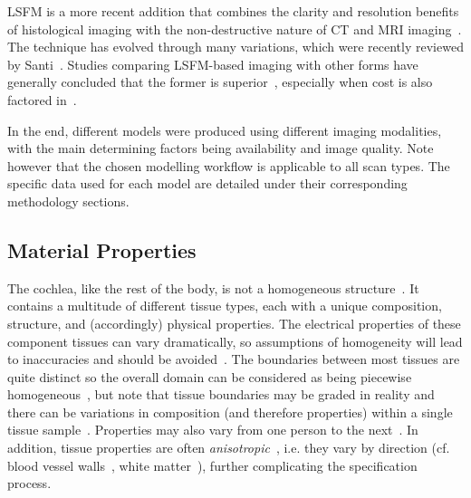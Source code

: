 LSFM is a more recent addition that combines the clarity and resolution benefits
of histological imaging with the non-destructive nature of CT and MRI
imaging~\cite{voie2002,buytaert2011}. The technique has evolved through many
variations, which were recently reviewed by Santi~\cite{santi2011}. Studies
comparing LSFM-based imaging with other forms have generally concluded that the
former is superior~\cite{hofman2009,buytaert2013,johnson2014}, especially when
cost is also factored in~\cite{santi2011}.

In the end, different models were produced using different imaging modalities,
with the main determining factors being availability and image quality. Note
however that the chosen modelling workflow is applicable to all scan types. The
specific data used for each model are detailed under their corresponding
methodology sections.

\subsection{Material Properties}
\label{sect:material_properties}

The cochlea, like the rest of the body, is not a homogeneous
structure~\cite{grimnes2000}. It contains a multitude of different tissue types,
each with a unique composition, structure, and (accordingly) physical
properties. The electrical properties of these component tissues can vary
dramatically, so assumptions of homogeneity will lead to inaccuracies and should
be avoided~\cite{macleod2009,lau2011}. The boundaries between most tissues are
quite distinct so the overall domain can be considered as being piecewise
homogeneous~\cite{plonsey1969,miller1990}, but note that tissue boundaries may
be graded in reality and there can be variations in composition (and therefore
properties) within a single tissue sample~\cite{dallos1996}. Properties may also
vary from one person to the next~\cite{erixon2009,lau2011}. In addition, tissue
properties are often \emph{anisotropic}~\cite{grimnes2000}, i.e. they vary by
direction (cf. blood vessel walls~\cite{edgerton1975,wyatt1984}, white
matter~\cite{lau2011,lee2011}), further complicating the specification process.

